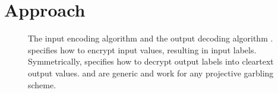 \section{Approach}\label{sec:approach}

\begin{figure}
  \centering
  \begin{minipage}[t]{0.48\textwidth}
    \vspace{0pt}
    
  \end{minipage}
  \begin{minipage}[t]{0.48\textwidth}
    \vspace{0pt}
    
  \end{minipage}
  \caption{%
    The input encoding algorithm \gEn and the output decoding
    algorithm \gDe.
    \gEn specifies how to encrypt input values, resulting in input labels.
    Symmetrically, \gDe specifies how to decrypt output labels into cleartext output values.
    \gEn and \gDe are generic and work for any
    projective garbling scheme.
  }\label{fig:EnDeProjective-scheme}
\end{figure}

